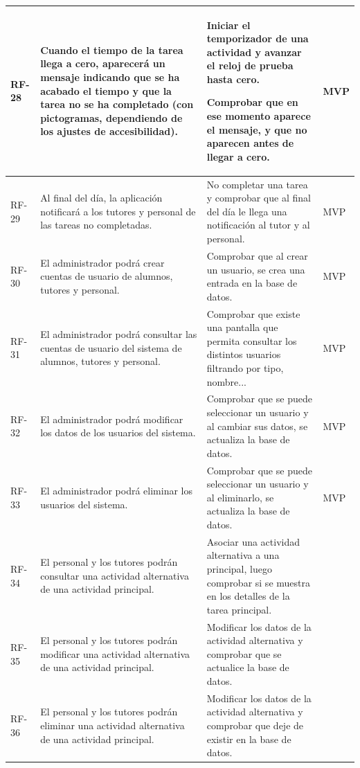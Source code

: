 \begin{longtable}{|>{\raggedright\arraybackslash}p{1cm}|>{\raggedright\arraybackslash}p{6cm}|>{\criterioinicio}p{5.9cm}<{\criteriofin}|>{\centering\arraybackslash}p{1.8cm}|}
\hline
\hypertarget{rf-28}{}RF-28 & Cuando el tiempo de la tarea llega a cero, aparecerá un mensaje indicando que se ha acabado el tiempo y que la tarea no se ha completado (con pictogramas, dependiendo de los ajustes de accesibilidad). & Iniciar el temporizador de una actividad y avanzar el reloj de prueba hasta cero. \item Comprobar que en ese momento aparece el mensaje, y que no aparecen antes de llegar a cero. & MVP \\
\hline
\hypertarget{rf-29}{}RF-29 & Al final del día, la aplicación notificará a los tutores y personal de las tareas no completadas. & No completar una tarea y comprobar que al final del día le llega una notificación al tutor y al personal. & MVP \\
\hline
\hypertarget{rf-30}{}RF-30 & El administrador podrá crear cuentas de usuario de alumnos, tutores y personal. & Comprobar que al crear un usuario, se crea una entrada en la base de datos. & MVP \\
\hline
\hypertarget{rf-31}{}RF-31 & El administrador podrá consultar las cuentas de usuario del sistema de alumnos, tutores y personal. & Comprobar que existe una pantalla que permita consultar los distintos usuarios filtrando por tipo, nombre... & MVP \\
\hline
\hypertarget{rf-32}{}RF-32 & El administrador podrá modificar los datos de los usuarios del sistema. & Comprobar que se puede seleccionar un usuario y al cambiar sus datos, se actualiza la base de datos. & MVP \\
\hline
\hypertarget{rf-33}{}RF-33 & El administrador podrá eliminar los usuarios del sistema. & Comprobar que se puede seleccionar un usuario y al eliminarlo, se actualiza la base de datos. & MVP \\
\hline
\hypertarget{rf-34}{}RF-34 & El personal y los tutores podrán consultar una actividad alternativa de una actividad principal. & Asociar una actividad alternativa a una principal, luego comprobar si se muestra en los detalles de la tarea principal. &  \\
\hline
\hypertarget{rf-35}{}RF-35 & El personal y los tutores podrán modificar una actividad alternativa de una actividad principal. & Modificar los datos de la actividad alternativa y comprobar que se actualice la base de datos. &  \\
\hline
\hypertarget{rf-36}{}RF-36 & El personal y los tutores podrán eliminar una actividad alternativa de una actividad principal. & Modificar los datos de la actividad alternativa y comprobar que deje de existir en la base de datos. &  \\

\end{longtable}
